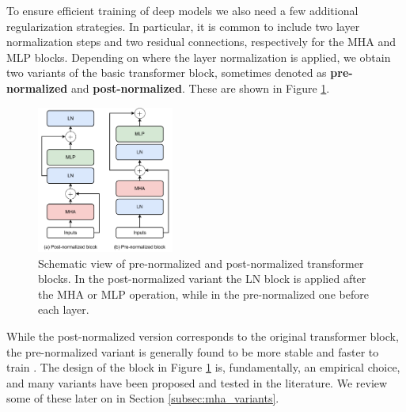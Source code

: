 To ensure efficient training of deep models we also need a few additional regularization strategies. In particular, it is common to include two layer normalization steps and two residual connections, respectively for the MHA and MLP blocks. Depending on where the layer normalization is applied, we obtain two variants of the basic transformer block, sometimes denoted as \textbf{pre-normalized} and \textbf{post-normalized}. These are shown in Figure \ref{fig:pre_post_normalization}.

\begin{figure}
    \centering
    \hspace{2em}\includegraphics[width=0.4\textwidth]{images/transformer_block}
    \caption{Schematic view of pre-normalized and post-normalized transformer blocks. In the post-normalized variant the LN block is applied after the MHA or MLP operation, while in the pre-normalized one before each layer.}
    \label{fig:pre_post_normalization}
\end{figure}

While the post-normalized version corresponds to the original transformer block, the pre-normalized variant is generally found to be more stable and faster to train \cite{xiong2020layer}. The design of the block in Figure \ref{fig:pre_post_normalization} is, fundamentally, an empirical choice, and many variants have been proposed and tested in the literature. We review some of these later on in Section \ref{subsec:mha_variants}.

